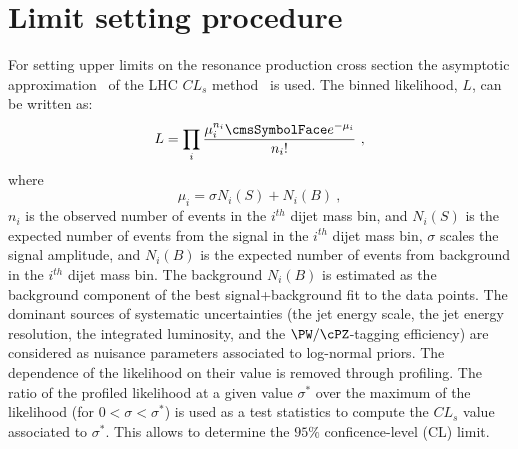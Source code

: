 \newpage
\section{Limit setting procedure}
\label{sec:statistics}

For setting upper limits on the resonance production cross section
the asymptotic approximation~\cite{AsymptCLs} of the LHC $CL_s$ method~\cite{CLs1,CLs2} is used.
The binned likelihood, $L$, can be written as:
\begin{equation}
L = \prod_{i} \frac{\mu_{i}^{n_{i}} \re^{-\mu_{i}}}{n_{i}!} \ ,
\end{equation}
where
\begin{equation}
{\mu_{i}} = {\sigma}{N_{i}(S)} + {N_{i}(B)} \ ,
\label{function}
\end{equation}
$n_i$ is the observed number of events in the $i^{th}$ dijet mass bin, and
$N_i(S)$ is the expected number of events from the signal in the $i^{th}$ dijet
mass bin, $\sigma$ scales the signal amplitude, and
$N_i(B)$ is the expected number of events from background in the
$i^{th}$ dijet mass bin.
The background $N_i(B)$ is estimated as the background component
of the best signal+background fit to the data points.
The dominant sources of systematic uncertainties (the jet energy
scale, the jet energy resolution, the integrated luminosity, and the
$\PW/\cPZ$-tagging efficiency) are considered as nuisance parameters associated to log-normal priors.
The dependence of the likelihood on their
value is removed through profiling. The ratio of the profiled
likelihood at a given value $\sigma^*$ over the maximum of the
likelihood (for $0<\sigma<\sigma^*$) is used as a test statistics
to compute the $CL_s$ value associated to $\sigma^*$. This allows to
determine the $95\%$ conficence-level (CL) limit.
